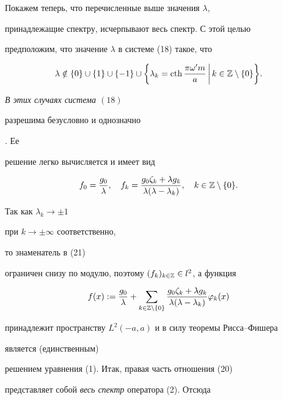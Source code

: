 Покажем теперь, что перечисленные выше значения $\lambda$,


принадлежащие спектру, исчерпывают весь спектр. С этой целью


предположим, что значение $\lambda$ в системе (18) такое, что


\begin{equation}


\lambda\notin \{0\}\cup\{1\}\cup\{-1\}\cup


\bigg\{\lambda_{k}=\cth\dfrac{\pi\omega' m}{a}\,\bigg|\,k\in


\Bbb{Z}\setminus\{0\}\bigg\}.


\end{equation}


{\it В этих случаях  система $(18)$


разрешима безусловно и однозначно}. Ее


решение легко вычисляется и имеет вид


\begin{equation}


f_{0}=\dfrac{g_{0}}{\lambda},\quad


f_{k}=\dfrac{g_{0}\zeta_{k}+\lambda g_{k}}


{\lambda(\lambda-\lambda_{k})},\quad


k\in \Bbb{Z}\setminus \{0\}.


\end{equation}


Так как $\lambda_{k}\rightarrow \pm 1$


при $k\rightarrow\pm\infty$ соответственно,


то знаменатель в (21)


ограничен снизу по модулю, поэтому $(f_{k})_{k\in \Bbb{Z}}\in


l^{2}$, а функция


$$


f(x):=\dfrac{g_{0}}{\lambda}+\sum_{k\in \Bbb{Z}\setminus\{0\}}


\dfrac{g_{0}\zeta_{k}+\lambda g_{k}}


{\lambda(\lambda-\lambda_{k})}\varphi_{k}(x)


$$


принадлежит пространству $L^{2}(-a,a)$ и в силу теоремы Рисса--Фишера


является (единственным)


решением уравнения (1). Итак, правая часть отношения (20)


представляет собой {\it весь спектр} оператора (2). Отсюда


